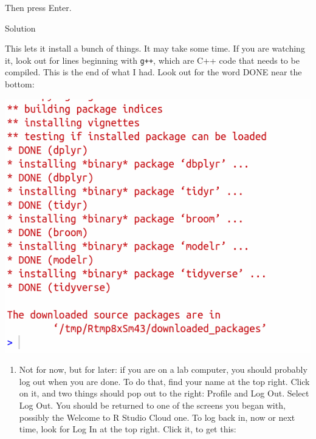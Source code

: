 \documentclass[]{tufte-book}
\providecommand{\tightlist}{%
  \setlength{\itemsep}{0pt}\setlength{\parskip}{0pt}}
\theoremstyle{definition}
\theoremstyle{definition}
\theoremstyle{definition}
\theoremstyle{remark}
\begin{document}
Then press Enter.

Solution

This lets it install a bunch of things. It may take some time. If you
are watching it, look out for lines beginning with \texttt{g++}, which
are C++ code that needs to be compiled. This is the end of what I had.
Look out for the word DONE near the bottom:

\includegraphics{Screenshot_2018-07-02_15-34-40.png}

\begin{enumerate}
\def\labelenumi{(\alph{enumi})}
\setcounter{enumi}{4}
\tightlist
\item
  Not for now, but for later: if you are on a lab computer, you should
  probably log out when you are done. To do that, find your name at the
  top right. Click on it, and two things should pop out to the right:
  Profile and Log Out. Select Log Out. You should be returned to one of
  the screens you began with, possibly the Welcome to R Studio Cloud
  one. To log back in, now or next time, look for Log In at the top
  right. Click it, to get this:
\end{enumerate}
\end{document}
